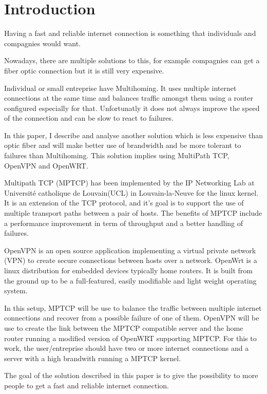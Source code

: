  \section{Introduction}

  Having a fast and reliable internet connection is something that individuals and compagnies would want.

  Nowadays, there are multiple solutions to this, for example compagnies can get a fiber optic connection but it is still very expensive.

  Individual or small entreprise have Multihoming. It uses multiple internet connections at the same time and balances traffic amongst them using a router configured especially for that.
  Unfortunatly it does not always improve the speed of the connection and can be slow to react to failures.

  In this paper, I describe and analyse another solution which is less expensive than optic fiber and will make better use of brandwidth
  and be more tolerant to failures than Multihoming. This solution implies using MultiPath TCP, OpenVPN and OpenWRT.

  Multipath TCP (MPTCP) has been implemented by the IP Networking Lab at Université catholique de Louvain(UCL) in Louvain-la-Neuve for the linux kernel. It is an extension of the TCP protocol,
  and it's goal is to support the use of multiple transport paths between a pair of hosts.
  The benefits of MPTCP include a performance improvement in term of throughput and a better handling of failures.

  OpenVPN is an open source application implementing a virtual private network (VPN) to create secure connections between hosts over a network.
  OpenWrt is a linux distribution for embedded devices typically home routers. It is built from the ground up to be a full-featured, easily modifiable and light weight operating system.

  In this setup, MPTCP will be use to balance the traffic between multiple internet connections and recover from a possible failure of one of them.
  OpenVPN will be use to create the link between the MPTCP compatible server and the home router running a modified version of OpenWRT supporting MPTCP.
  For this to work, the user/entreprise should have two or more internet connections and a server with a high brandwith running a MPTCP kernel.

  The goal of the solution described in this paper is to give the possibility to more people to get a fast and reliable internet connection.

